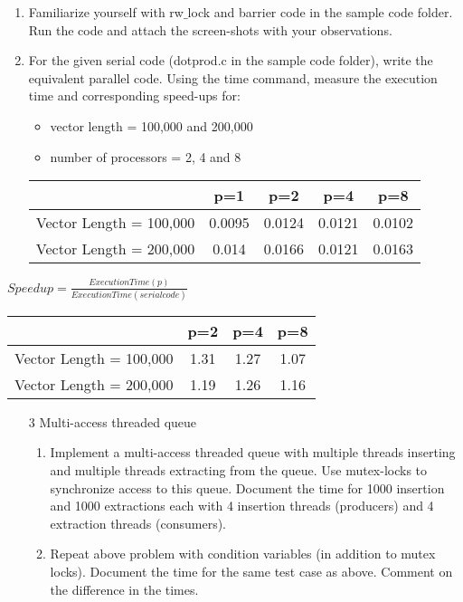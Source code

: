\documentclass{sem5}
\author{Hemant Kumar}
\begin{document}
\begin{enumerate}
\item Familiarize yourself with rw$\_$lock and barrier code in the sample code folder. Run the code and attach the screen-shots with your observations.
\begin{figure}[!htp]
\centering
\end{figure}
\item For the given serial code (dotprod.c in the sample code folder), write the equivalent parallel code. Using the time command, measure the execution time and corresponding speed-ups for:\\
\begin{itemize}
\item vector length = 100,000 and 200,000
\item number of processors = 2, 4 and 8
\end{itemize}
\begin{center}
\begin{tabular}{|c|c|c|c|c|}
\hline
& p=1 & p=2 & p=4 & p=8\\
\hline
Vector Length = 100,000 & 0.0095 & 0.0124 & 0.0121 & 0.0102 \\
\hline
Vector Length = 200,000 & 0.014 & 0.0166 & 0.0121 & 0.0163 \\
\hline
\end{tabular}

\end{center}
\end{enumerate}
\begin{center}
$Speedup = \frac{Execution Time(p)}{Execution Time(serial code)}$\\
\vspace*{1cm}
\begin{tabular}{|c|c|c|c|}
\hline
 & p=2 & p=4 & p=8\\
\hline
Vector Length = 100,000 & 1.31 & 1.27 & 1.07 \\
\hline
Vector Length = 200,000 & 1.19 & 1.26 & 1.16 \\
\hline
\end{tabular}
\end{center}
\begin{itemize}
\item[3] Multi-access threaded queue
\begin{enumerate}
\item Implement a multi-access threaded queue with multiple threads inserting and multiple threads extracting from the queue. Use mutex-locks to synchronize access to this queue. Document the time for 1000 insertion and 1000 extractions each with 4 insertion threads (producers) and 4 extraction threads (consumers).

\item Repeat above problem with condition variables (in addition to mutex locks). Document the time for the same test case as above. Comment on the difference in the times.

\end{enumerate}
\end{itemize}
\end{document}
